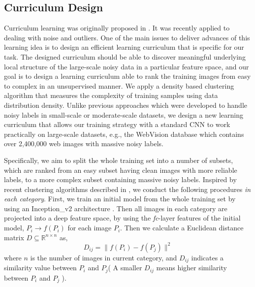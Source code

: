 \documentclass[runningheads]{llncs}
\begin{document}
\subsection{Curriculum Design}

Curriculum learning was originally proposed in \cite{bengio2009curriculum}. It was recently applied to dealing with noise and outliers. One of the main issues to deliver advances of this learning idea is to design an efficient learning curriculum that is specific for our task. The designed curriculum should be able to discover meaningful underlying local structure of the large-scale noisy data in a particular feature space, and our goal is to design a learning curriculum able to rank the training images from easy to complex  in an unsupervised manner. We apply a density based clustering algorithm that measures the complexity of training samples using data distribution density. Unlike previous approaches which were developed to handle noisy labels in small-scale or moderate-scale datasets, we design a new learning curriculum that allows our training strategy with a standard CNN to work practically on large-scale datasets, e.g., the WebVision database which contains over 2,400,000 web images with massive noisy labels.

Specifically, we aim to split the whole training set into a number of subsets, which are ranked from an easy subset having clean images with more reliable labels, to a more complex subset containing massive noisy labels. Inspired by recent clustering algorithms described in \cite{rodriguez2014clustering},  we conduct the following procedures \emph{in each category}. First, we train an initial model from the whole training set by using an Inception\_v2 architecture \cite{ioffe2015batch}. Then all images in each category are projected into a deep feature space, by using the \emph{fc}-layer features of the initial model, $P_i \rightarrow f(P_i)$ for each image $P_i$. Then we calculate a Euclidean distance matrix $D \subseteq \mathbb{R}^{n\times n}$ as,
\begin{equation}
D_{ij}=\|f(P_i )-f(P_j)\|^2
\end{equation}
where $n$ is the number of images in current category, and $D_{ij}$ indicates a similarity value between $P_i$ and $P_j$( A smaller $D_{ij}$ means higher similarity between $P_i$ and $P_j$ ).
\end{document}
